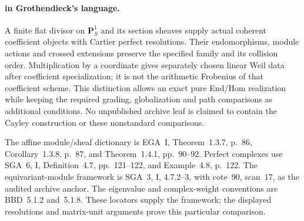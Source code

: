 \paragraph{ in Grothendieck's language.}
A finite flat divisor on $\mathbf P^1_S$ and its section
sheaves supply actual coherent coefficient objects with
Cartier perfect resolutions. Their endomorphisms, module
actions and crossed extensions preserve the specified
family and its collision order. Multiplication by a
coordinate gives separately chosen linear Weil data after
coefficient specialization; it is not the arithmetic
Frobenius of that coefficient scheme. This distinction
allows an exact pure End/Hom realization while keeping the
required grading, globalization and path comparisons as
additional conditions. No unpublished archive leaf is
claimed to contain the Cayley construction or these
nonstandard comparisons.

The affine module/sheaf dictionary is EGA~I, Theorem~1.3.7,
p.~86, Corollary~1.3.8, p.~87, and Theorem~1.4.1,
pp.~90--92. Perfect complexes use SGA~6, I, Definition~4.7,
pp.~121--122, and Example~4.8, p.~122. The equivariant-module
framework is SGA~3, I, 4.7.2--3, with cote~90, scan~17,
as the audited archive anchor. The eigenvalue and complex-weight
conventions are BBD~5.1.2 and~5.1.8. These locators supply
the framework; the displayed resolutions and matrix-unit
arguments prove this particular comparison.
